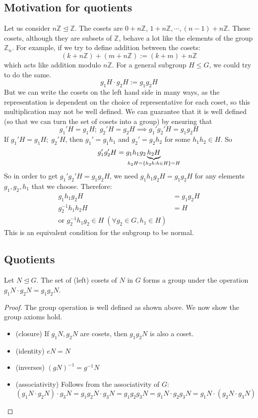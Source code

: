 \subsection{Motivation for quotients}
Let us consider \(n\mathbb Z \trianglelefteq \mathbb Z\).
The cosets are \(0+n\mathbb Z\), \(1 + n\mathbb Z, \cdots, (n-1) + n\mathbb Z\).
These cosets, although they are subsets of \(\mathbb Z\), behave a lot like the elements of the group \(\mathbb Z_n\).
For example, if we try to define addition between the cosets:
\[
	(k + n \mathbb Z) + (m + n \mathbb Z) := (k+m) + n \mathbb Z
\]
which acts like addition modulo \(n\mathbb Z\).
For a general subgroup \(H \leq G\), we could try to do the same.
\[
	g_1 H \cdot g_2 H := g_1 g_2 H
\]
But we can write the cosets on the left hand side in many ways, as the representation is dependent on the choice of representative for each coset, so this multiplication may not be well defined.
We can guarantee that it is well defined (so that we can turn the set of cosets into a group) by ensuring that
\[
	g_1' H = g_1 H;\; g_2' H = g_2 H \implies g_1'g_2'H = g_1g_2H
\]
If \(g_1' H = g_1 H;\; g_2' H\), then \(g_1' = g_1h_1\) and \(g_2' = g_2h_2\) for some \(h_1 h_2 \in H\).
So
\[
	g_1'g_2'H = g_1h_1g_2\underbrace{h_2H}_{\mathclap{h_2H = \{ h_2h : h \in H \} = H}}
\]
So in order to get \(g_1' g_2' H = g_1 g_2 H\), we need \(g_1 h_1 g_2 H = g_1 g_2 H\) for any elements \(g_1, g_2, h_1\) that we choose.
Therefore:
\begin{align*}
	g_1h_1g_2H         & = g_1g_2 H \\
	g_2^{-1} h_1 h_2 H & = H        \\
	\text{or } g_2^{-1} h_1 g_2 \in H\;(\forall g_2 \in G, h_1 \in H)
\end{align*}
This is an equivalent condition for the subgroup to be normal.

\subsection{Quotients}
\begin{proposition}
	Let \(N \trianglelefteq G\).
	The set of (left) cosets of \(N\) in \(G\) forms a group under the operation \(g_1N\cdot g_2N = g_1g_2N\).
\end{proposition}
\begin{proof}
	The group operation is well defined as shown above.
	We now show the group axioms hold.
	\begin{itemize}
		\item (closure) If \(g_1N, g_2N\) are cosets, then \(g_1g_2N\) is also a coset.
		\item (identity) \(eN = N\)
		\item (inverses) \((gN)^{-1} = g^{-1}N\)
		\item (associativity) Follows from the associativity of \(G\): \((g_1 N \cdot g_2 N)\cdot g_3 N = g_1g_2 N \cdot g_3 N = g_1g_2g_3 N = g_1 N \cdot g_2g_3 N = g_1 N \cdot (g_2 N \cdot g_3 N)\)
	\end{itemize}
\end{proof}

